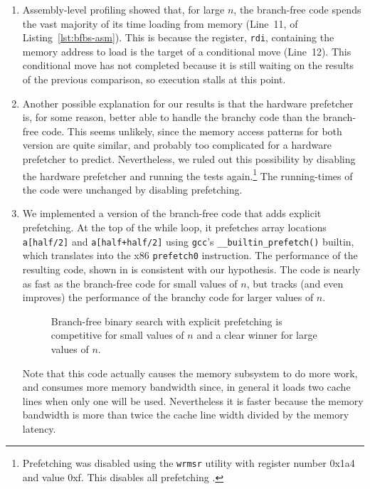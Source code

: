 \documentclass{patmorin}
\newcommand{\lstref}[1]{Listing~\ref{lst:#1}}
\begin{document}
\begin{enumerate}
\item Assembly-level profiling showed that, for large $n$, the
  branch-free code spends the vast majority of its time loading from
  memory (Line~11, of \lstref{bfbs-asm}).  This is because the register,
  \texttt{rdi},  containing the memory address to load is the
  target of a conditional move (Line~12).  This conditional move has not
  completed because it is still waiting on the results of the previous
  comparison, so execution stalls at this point.

\item Another possible explanation for our results is that the hardware
   prefetcher is, for some reason, better able to handle the branchy
   code than the branch-free code.  This seems unlikely, since the memory
   access patterns for both version are quite similar, and probably too
   complicated for a hardware prefetcher to predict. Nevertheless, we
   ruled out this possibility by disabling the hardware prefetcher and
   running the tests again.\footnote{Prefetching was disabled using the
   \texttt{wrmsr} utility with register number 0x1a4 and
   value 0xf.  This disables all prefetching \cite{intel:optimizing}.}
   The running-times of the code were unchanged by disabling prefetching.

\item We implemented a version of the branch-free code that adds explicit
   prefetching. At the top of the while loop, it
   prefetches array locations \texttt{a[half/2]}
   and \texttt{a[half+half/2]} using \texttt{gcc}'s
   \texttt{__builtin_prefetch()} builtin, which translates into
   the x86 \texttt{prefetch0} instruction.  The performance of
   the resulting code, shown in  is consistent with our
   hypothesis.  The code is nearly as fast as the branch-free code for
   small values of $n$, but tracks (and even improves) the performance
   of the branchy code for larger values of $n$.

\begin{figure}
   \caption{Branch-free binary search with explicit prefetching is competitive
    for small values of $n$ and a clear winner for large values of $n$.}
\end{figure}

   Note that this code actually causes the memory subsystem to do more
   work, and consumes more memory bandwidth since, in general it loads
   two cache lines when only one will be used.  Nevertheless it is faster
   because the memory bandwidth is more than twice the cache line width
   divided by the memory latency.


\end{enumerate}
\end{document}
